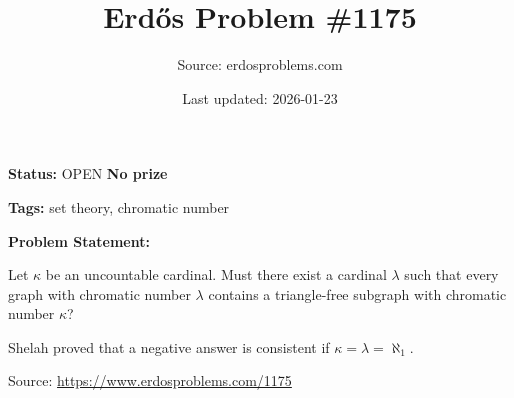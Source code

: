 \documentclass{article}
\title{Erd\H{o}s Problem \#1175}
\date{Last updated: 2026-01-23}
\author{Source: erdosproblems.com}
\begin{document}
\maketitle

\noindent\textbf{Status:} OPEN \quad \textbf{No prize}

\noindent\textbf{Tags:} set theory, chromatic number

\medskip

\noindent\textbf{Problem Statement:}

Let $\kappa$ be an uncountable cardinal. Must there exist a cardinal $\lambda$ such that every graph with chromatic number $\lambda$ contains a triangle-free subgraph with chromatic number $\kappa$?




Shelah proved that a negative answer is consistent if $\kappa=\lambda=\aleph_1$.


\bigskip
\noindent\small{Source: \url{https://www.erdosproblems.com/1175}}
\end{document}
